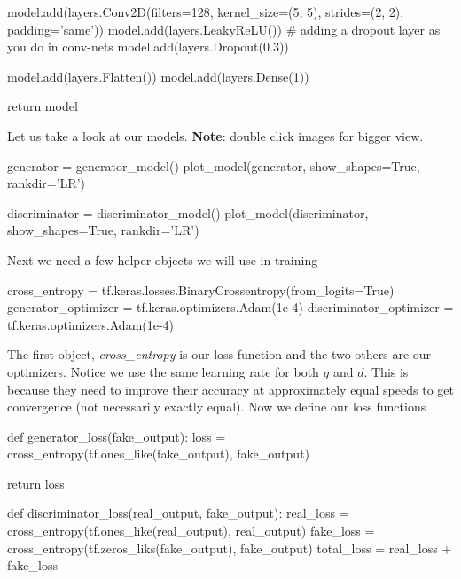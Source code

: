 \documentclass[%
oneside,                 %
final,                   %
10pt]{article}
\begin{document}
    model.add(layers.Conv2D(filters=128,
                            kernel_size=(5, 5),
                            strides=(2, 2),
                            padding='same'))
    model.add(layers.LeakyReLU())
    # adding a dropout layer as you do in conv-nets
    model.add(layers.Dropout(0.3))

    model.add(layers.Flatten())
    model.add(layers.Dense(1))

    return model

\epycod


Let us take a look at our models. \textbf{Note}: double click images for bigger view.




\bpycod
generator = generator_model()
plot_model(generator, show_shapes=True, rankdir='LR')

\epycod





\bpycod
discriminator = discriminator_model()
plot_model(discriminator, show_shapes=True, rankdir='LR')

\epycod


Next we need a few helper objects we will use in training





\bpycod
cross_entropy = tf.keras.losses.BinaryCrossentropy(from_logits=True)
generator_optimizer = tf.keras.optimizers.Adam(1e-4)
discriminator_optimizer = tf.keras.optimizers.Adam(1e-4)

\epycod


The first object, \emph{cross_entropy} is our loss function and the two others are
our optimizers. Notice we use the same learning rate for both $g$ and $d$. This
is because they need to improve their accuracy at approximately equal speeds to
get convergence (not necessarily exactly equal). Now we define our loss
functions






\bpycod
def generator_loss(fake_output):
    loss = cross_entropy(tf.ones_like(fake_output), fake_output)

    return loss

\epycod









\bpycod
def discriminator_loss(real_output, fake_output):
    real_loss = cross_entropy(tf.ones_like(real_output), real_output)
    fake_loss = cross_entropy(tf.zeros_liks(fake_output), fake_output)
    total_loss = real_loss + fake_loss
\end{document}
